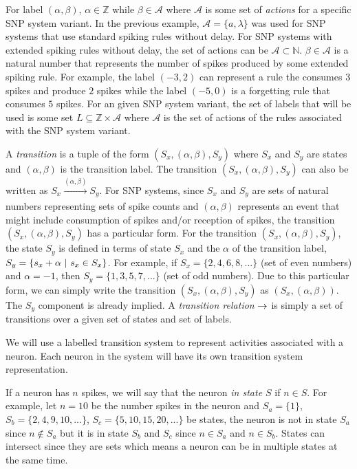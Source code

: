 \documentclass[runningheads,a4paper]{llncs}
\begin{document}
For label $(\alpha,\beta)$, $\alpha \in \mathbb{Z}$ while $\beta \in \mathcal{A}$ where 
$\mathcal{A}$ is some set of \emph{actions} for a specific SNP system variant. In the previous 
example, $\mathcal{A} = \{a,\lambda\}$ was used for SNP systems that use standard spiking rules 
without delay. For SNP systems with extended spiking rules without delay, the set of actions can be
$\mathcal{A} \subset \mathbb{N}$. $\beta \in \mathcal{A}$ is a natural number that represents the
number of spikes produced by some extended spiking rule. For example, the label $(-3,2)$ can
represent a rule the consumes $3$ spikes and produce $2$ spikes while the label $(-5,0)$ is a 
forgetting rule that consumes $5$ spikes. For an given SNP system variant, the set of labels that 
will be used is some set $L \subseteq \mathbb{Z} \times \mathcal{A}$ where $\mathcal{A}$ is the 
set of actions of the rules associated with the SNP system variant.

A \emph{transition} is a tuple of the form $(S_x, (\alpha,\beta), S_y)$ where $S_x$ and $S_y$ are
states and $(\alpha, \beta)$ is the transition label. The transition $(S_x,(\alpha,\beta),S_y)$ can
also be written as $S_x \xrightarrow[]{(\alpha,\beta)} S_y$. For SNP systems, since $S_x$ and $S_y$
are sets of natural numbers representing sets of spike counts and $(\alpha, \beta)$ represents an
event that might include consumption of spikes and/or reception of spikes, the transition 
$(S_x, (\alpha,\beta),S_y)$ has a particular form. For the transition $(S_x, (\alpha,\beta),S_y)$,
the state $S_y$ is defined in terms of state $S_x$ and the $\alpha$ of the transition label,
$S_y = \{s_x + \alpha\text{ }| \text{ } s_x \in S_x \}$. For example, if $S_x = \{2,4,6,8,...\}$  (set of even 
numbers) and $\alpha = -1$, then $S_y = \{1,3,5,7,...\}$ (set of odd numbers). Due to this 
particular form, we can simply write the transition $(S_x, (\alpha,\beta),S_y)$ as 
$(S_x, (\alpha,\beta))$. The $S_y$ component is already implied. A \emph{transition relation} $\rightarrow$ 
is simply a set of transitions over a given set of states and set of labels.

We will use a labelled transition system to represent activities associated with a neuron. Each 
neuron in the system will have its own transition system representation. 


If a neuron has $n$ spikes, we will say that the neuron \emph{in state $S$} if $n \in S$. For
example, let $n=10$ be the number spikes in the neuron and $S_a=\{1\}$, $S_b=\{2,4,9,10,...\}$, 
$S_c=\{5,10,15,20,...\}$ be states, the neuron is not in state $S_a$ since $n \notin S_a$ but it is
in state $S_b$ and $S_c$ since $n \in S_a$ and $n \in S_b$. States can intersect since they are sets
which means a neuron can be in multiple states at the same time. 
\end{document}
